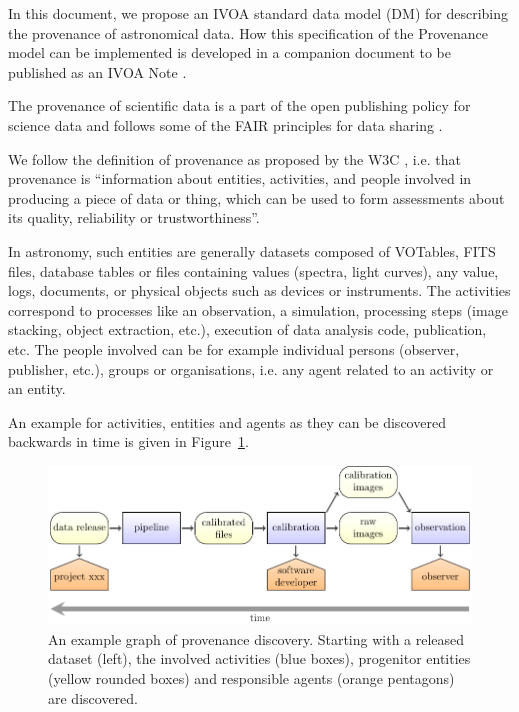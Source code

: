 
In this document, we propose an IVOA standard data model (DM) for describing the provenance of astronomical data. 
How this specification of the Provenance model can be implemented is developed in a companion document to be published as an IVOA Note \citep{std:ProvenanceImplementationNote}.

The provenance of scientific data is a part of the open publishing policy for science data and follows some of the FAIR principles for data sharing \citep{FAIR-principles}.

We follow the definition of provenance as proposed by the W3C \citep{std:W3CProvDM}, i.e. that provenance is ``information about entities, activities, and people involved in producing a piece of data or thing, which can be used to form assessments about its quality, reliability or trustworthiness''.

In astronomy, such entities are generally datasets composed of VOTables, FITS files, database tables or files containing values (spectra, light curves), any value, logs, documents, or physical objects such as devices or instruments.
The activities correspond to processes like an observation, a simulation, processing steps (image stacking, object extraction, etc.), execution of data analysis code, publication, etc.
The people involved can be for example individual persons (observer, publisher, etc.), groups or organisations, i.e. any agent related to an activity or an entity.

An example for activities, entities and agents as they can be discovered backwards in time is given in Figure~\ref{fig:example-workflow}.


\begin{figure}[ht]
\centering
\includegraphics[width=1\textwidth]{workflow-backwards.pdf}
\caption[Example graph of provenance discovery]{An example graph of provenance discovery. Starting with a released dataset (left), the involved activities (blue boxes), 
progenitor entities (yellow rounded boxes) and responsible agents (orange pentagons) are 
discovered.}
\label{fig:example-workflow}
\end{figure}


